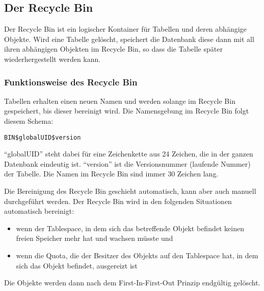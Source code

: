       \subsection{Der Recycle Bin}
        Der Recycle Bin ist ein logischer Kontainer für Tabellen und deren abhängige Objekte. Wird eine Tabelle gelöscht, speichert die Datenbank diese dann mit all ihren abhängigen Objekten im Recycle Bin, so dass die Tabelle später wiederhergestellt werden kann.
        \subsubsection{Funktionsweise des Recycle Bin}
          Tabellen erhalten einen neuen Namen und werden solange im Recycle Bin gespeichert, bis dieser bereinigt wird. Die Namensgebung im Recycle Bin folgt diesem Schema:

          \verb+BIN$globalUID$version+

          \enquote{globalUID} steht dabei für eine Zeichenkette aus 24 Zeichen, die in der ganzen Datenbank eindeutig ist. \enquote{version} ist die Versionsnummer (laufende Nummer) der Tabelle. Die Namen im Recycle Bin sind immer 30 Zeichen lang.

          Die Bereinigung des Recycle Bin geschieht automatisch, kann aber auch manuell durchgeführt werden. Der Recycle Bin wird in den folgenden Situationen automatisch bereinigt:
          \begin{itemize}
            \item wenn der Tablespace, in dem sich das betreffende Objekt befindet keinen freien Speicher mehr hat und wachsen müsste und
            \item wenn die Quota, die der Besitzer des Objekts auf den Tablespace hat, in dem sich das Objekt befindet, ausgereizt ist
          \end{itemize}
          Die Objekte werden dann nach dem First-In-First-Out Prinzip endgültig gelöscht.

